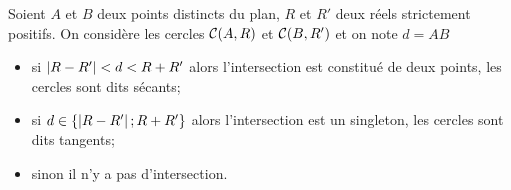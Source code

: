 \begin{prop}
    Soient \(A\) et \(B\) deux points distincts du plan, \(R\) et \(R'\) deux 
    réels strictement positifs. On considère les cercles \(\mathcal{C}(A,R)\) et 
    \(\mathcal{C}(B,R')\) et on note \(d = AB\)
    \begin{itemize}
        \item si \(\left\lvert R - R'\right\rvert<d<R + R'\) alors l'intersection est constitué de 
            deux points, les cercles sont dits sécants;
        \item si \(d \in \{\left\lvert R - R'\right\rvert;R + R'\}\) alors l'intersection est un 
            singleton, les cercles sont dits tangents;
        \item sinon il n'y a pas d'intersection.
    \end{itemize}
\end{prop}

